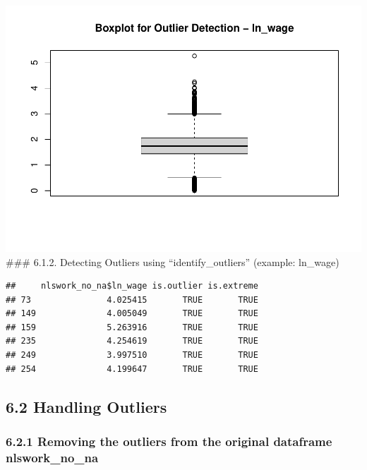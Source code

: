 \documentclass[
]{article}
\newenvironment{Shaded}{\begin{snugshade}}{\end{snugshade}}
\newcommand{\FunctionTok}[1]{\textcolor[rgb]{0.13,0.29,0.53}{\textbf{#1}}}
\newcommand{\NormalTok}[1]{#1}
\newcommand{\OtherTok}[1]{\textcolor[rgb]{0.56,0.35,0.01}{#1}}
\newcommand{\SpecialCharTok}[1]{\textcolor[rgb]{0.81,0.36,0.00}{\textbf{#1}}}
\begin{document}
\includegraphics{RIntro_files/figure-latex/unnamed-chunk-14-1.pdf}
\#\#\# 6.1.2. Detecting Outliers using ``identify\_outliers'' (example:
ln\_wage)

\begin{Shaded}
\end{Shaded}

\begin{verbatim}
##     nlswork_no_na$ln_wage is.outlier is.extreme
## 73               4.025415       TRUE       TRUE
## 149              4.005049       TRUE       TRUE
## 159              5.263916       TRUE       TRUE
## 235              4.254619       TRUE       TRUE
## 249              3.997510       TRUE       TRUE
## 254              4.199647       TRUE       TRUE
\end{verbatim}

\hypertarget{handling-outliers}{%
\subsection{6.2 Handling Outliers}\label{handling-outliers}}

\hypertarget{removing-the-outliers-from-the-original-dataframe-nlswork_no_na}{%
\subsubsection{6.2.1 Removing the outliers from the original dataframe
nlswork\_no\_na}\label{removing-the-outliers-from-the-original-dataframe-nlswork_no_na}}
\end{document}
